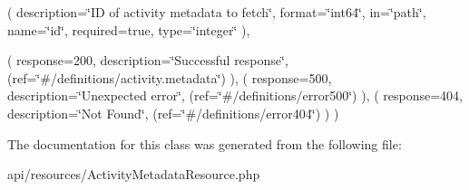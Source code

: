 ( description=\char`\"{}\+I\+D of activity metadata to fetch\char`\"{}, format=\char`\"{}int64\char`\"{}, in=\char`\"{}path\char`\"{}, name=\char`\"{}id\char`\"{}, required=true, type=\char`\"{}integer\char`\"{} ),

( response=200, description=\char`\"{}\+Successful response\char`\"{}, (ref=\char`\"{}\#/definitions/activity.\+metadata\char`\"{}) ), ( response=500, description=\char`\"{}\+Unexpected error\char`\"{}, (ref=\char`\"{}\#/definitions/error500\char`\"{}) ), ( response=404, description=\char`\"{}\+Not Found\char`\"{}, (ref=\char`\"{}\#/definitions/error404\char`\"{}) ) ) 


The documentation for this class was generated from the following file\+:\begin{DoxyCompactItemize}
\item 
api/resources/Activity\+Metadata\+Resource.\+php\end{DoxyCompactItemize}

